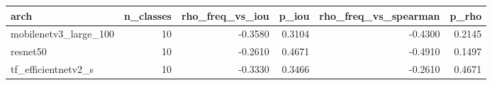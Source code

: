 \begin{tabular}{lrrrrr}
\toprule
arch & n\_classes & rho\_freq\_vs\_iou & p\_iou & rho\_freq\_vs\_spearman & p\_rho \\
\midrule
mobilenetv3\_large\_100 & 10 & -0.3580 & 0.3104 & -0.4300 & 0.2145 \\
resnet50 & 10 & -0.2610 & 0.4671 & -0.4910 & 0.1497 \\
tf\_efficientnetv2\_s & 10 & -0.3330 & 0.3466 & -0.2610 & 0.4671 \\
\bottomrule
\end{tabular}
